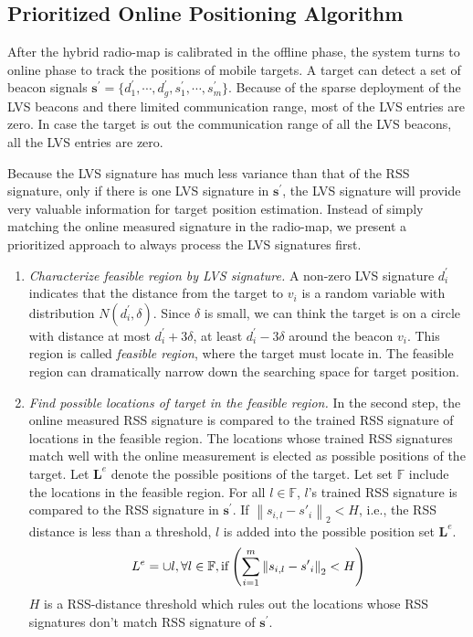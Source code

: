 \documentclass[conference, 10pt]{IEEEtran}
\begin{document}
\subsection{Prioritized Online Positioning Algorithm}
After the hybrid radio-map is calibrated in the offline phase, the system turns to online phase to track the positions of mobile targets. A target can detect a set of beacon signals $\mathbf{s}^{'}=\{d_{1}^{'}, \cdots, d_{g}^{'}, s_{1}^{'}, \cdots, s_{m}^{'}\}$. Because of the sparse deployment of the LVS beacons and there limited communication range, most of the LVS entries are zero. In case the target is out the communication range of all the LVS beacons, all the LVS entries are zero. 

Because the LVS signature has much less variance than that of the RSS signature, only if there is one LVS signature in $\mathbf{s}^{'}$, the LVS signature will provide very valuable information for target position estimation. Instead of simply matching the online measured signature in the radio-map, we present a prioritized approach to always process the LVS signatures first. 
\begin{enumerate}
\item \emph{Characterize feasible region by LVS signature.} A non-zero LVS signature $d_{i}^{'}$ indicates that the distance from the target to $v_{i}$ is a random variable with distribution $N(d_{i}^{'}, \delta)$. Since $\delta$ is small, we can think the target is on a circle with distance at most $d_{i}^{'}+3\delta$, at least $d_{i}^{'}-3\delta$ around the beacon $v_{i}$. This region is called \emph{feasible region}, where the target must locate in. The feasible region can dramatically narrow down the searching space for target position. 
\item \emph{Find possible locations of target in the feasible region.} In the second step, the online measured RSS signature is compared to the trained RSS signature of locations in the feasible region. The locations whose trained RSS signatures match well with the online measurement is elected as possible positions of the  target. Let $\mathbf{L}^{e}$ denote the possible positions of the target. Let set $\mathbb{F}$ include the locations in the feasible region. For all $ l \in \mathbb{F}$, $l$'s trained RSS signature is compared to the RSS signature in $\mathbf{s}^{'}$. If $\left\| {{s_{i,l}} - {{s'}_i}} \right\|_2 <H$, i.e., the RSS distance is less than a threshold, $l$ is added into the possible position set $\mathbf{L}^{e}$. 
\begin{equation}
{L^e} =  \cup l,{\rm{ }}\forall l \in \mathbb{F}{\rm{, if }}\left( {\sum\limits_{i = 1}^m {{{\left\| {{s_{i,l}} - {{s'}_i}} \right\|}_2}}  < H} \right)
 \end{equation}
$H$ is a RSS-distance threshold which rules out the locations whose RSS signatures don't match RSS signature of $\mathbf{s}^{'}$.
\end{enumerate}
\end{document}
